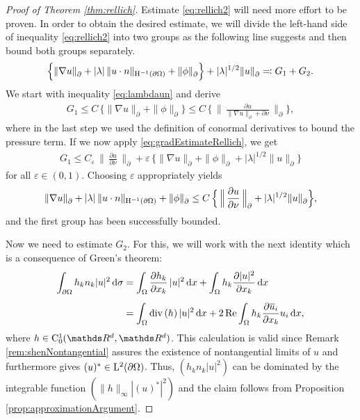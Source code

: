 \begin{proof}[Proof of Theorem \ref{thm:rellich}]
  Estimate \eqref{eq:rellich2} will need more effort to be proven.
  In order to obtain the desired estimate, we will divide the left-hand side of inequality \eqref{eq:rellich2} into two groups as the following line suggests and then bound both groups separately.
  \begin{align*}
      \Big\{ \|\nabla u\|^{}_\partial + |\lambda|\, \|u \cdot n\|_{\mathrm{H}^{-1}(\partial\Omega)} + \|\phi\|^{}_\partial \Big\} + |\lambda|^{1/2} \|u\|^{}_\partial \eqqcolon G_1 + G_2.
  \end{align*}
  We start with inequality \eqref{eq:lambdaun} and derive
  \begin{align*}
    G_1
    \leq C\, \Big\{ \|\nabla u\|^{}_\partial + \| \phi\|^{}_\partial \Big\}
    \leq C \, \Big\{\, \Big\|\,\frac{\partial u}{\|\nabla u\|^{}_\partial +\partial \nu}\, \Big\|^{}_\partial  \Big\},
  \end{align*}
  where in the last step we used the definition of conormal derivatives to bound the pressure term.
  If we now apply \eqref{eq:gradEstimateRellich}, we get
  \begin{align*}
    G_1
    \leq C_\varepsilon\, \Big\| \, \frac{\partial u}{\partial \nu} \, \Big\|^{}_\partial + \varepsilon \, \Big\{ \|\nabla u\|^{}_\partial + \|\phi\|^{}_\partial + |\lambda|^{1/2} \| u \|^{}_\partial \Big\}
  \end{align*}
  for all $\varepsilon \in (0,1)$.
  Choosing $\varepsilon$ appropriately yields
  \begin{align}
    \label{eq:partOfRellich2}
    \|\nabla u\|^{}_\partial + |\lambda| \, \|u \cdot n\|_{\mathrm{H}^{-1}(\partial\Omega)}+ \|\phi\|^{}_\partial 
    \leq C\, \Big\{ \, \Big\|\,\frac{\partial u}{\partial \nu} \, \Big\|^{}_\partial + |\lambda|^{1/2} \| u\|^{}_\partial \Big\},
  \end{align}
  and the first group has been successfully bounded.

  Now we need to estimate $G_2$.
  For this, we will work with the next identity which is a consequence of Green's theorem:
  \begin{align}
    \int_{\partial\Omega} h_k n_k |u|^2 \, {\operatorname{d}\!{\sigma}}
    &= \int_{\Omega} \frac{\partial h_k}{\partial x_k}\, |u|^2 \, {\operatorname{d}\!{x}} + \int_{\Omega} h_k \frac{\partial |u|^2}{\partial x_k}  \, {\operatorname{d}\!{x}} \nonumber\\[0.5em]
    \label{eq:hknkgreen}
    &= \int_\Omega \mathrm{div\,} (h)\, |u|^2 \, {\operatorname{d}\!{x}} + 2 \operatorname{Re} \int_\Omega h_k \frac{\partial \overline u_i}{\partial x_k} u_i \, {\operatorname{d}\!{x}},
  \end{align}
  where $h \in \CC_0^1(\R^d, \R^d)$.
  This calculation is valid since Remark \ref{rem:shenNontangential} assures the existence of nontangential limits of $u$ and furthermore gives $(u)^* \in \mathrm{L}^2(\partial\Omega)$. Thus, $( h_k n_k |u|^2 )$ can be dominated by the integrable function $(\|h\|_\infty |(u)^*|^2)$ and the claim follows from Proposition \ref{prop:approximationArgument}.


\end{proof}
